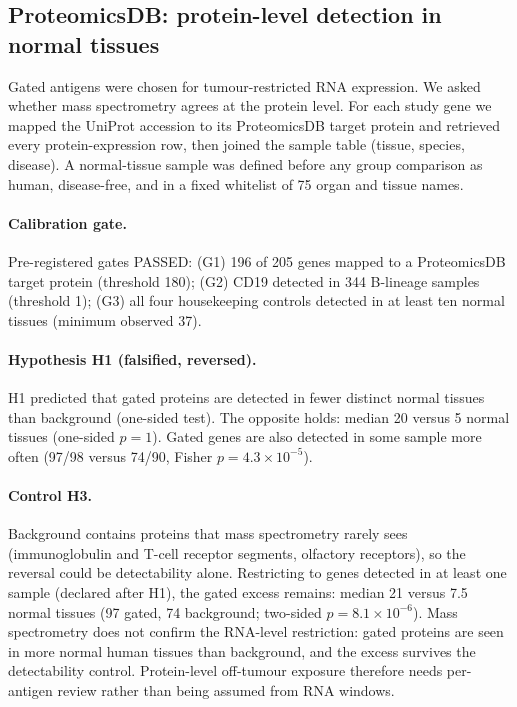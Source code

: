 \subsection{ProteomicsDB: protein-level detection in normal tissues}
\label{sec:proteomicsdb}
Gated antigens were chosen for tumour-restricted RNA expression. We asked
whether mass spectrometry agrees at the protein level. For each study gene we
mapped the UniProt accession to its ProteomicsDB target protein and retrieved
every protein-expression row, then joined the sample table (tissue, species,
disease). A normal-tissue sample was defined before any group comparison as
human, disease-free, and in a fixed whitelist of 75 organ and tissue names.

\paragraph{Calibration gate.} Pre-registered gates PASSED: (G1) 196 of
205 genes mapped to a ProteomicsDB target protein (threshold 180);
(G2) CD19 detected in 344 B-lineage samples (threshold 1); (G3) all four
housekeeping controls detected in at least ten normal tissues (minimum
observed 37).
\paragraph{Hypothesis H1 (falsified, reversed).} H1 predicted that gated
proteins are detected in fewer distinct normal tissues than background
(one-sided test).
The opposite holds: median 20 versus 5 normal tissues
(one-sided $p=1$). Gated genes are also detected in some sample more
often (97/98 versus 74/90, Fisher $p=4.3\times10^{-5}$).

\paragraph{Control H3.} Background contains proteins that mass spectrometry
rarely sees (immunoglobulin and T-cell receptor segments, olfactory
receptors), so the reversal could be detectability alone.
Restricting to genes detected in at least one sample (declared after H1),
the gated excess remains: median 21 versus 7.5 normal tissues
(97 gated, 74 background; two-sided $p=8.1\times10^{-6}$).
Mass spectrometry does not confirm the RNA-level restriction: gated proteins are seen in more normal human tissues than background, and the excess survives the detectability control. Protein-level off-tumour exposure therefore needs per-antigen review rather than being assumed from RNA windows.

